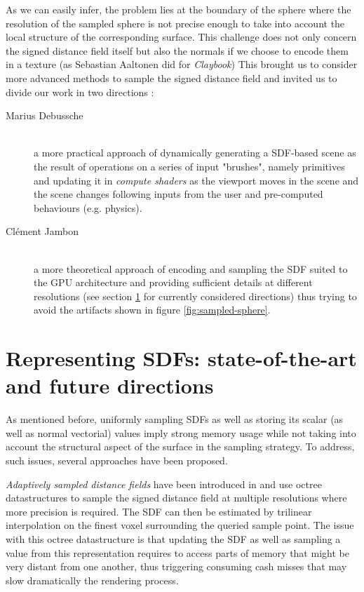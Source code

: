 \documentclass[10pt,a4paper,english, twocolumn]{article}
\begin{document}
As we can easily infer, the problem lies at the boundary of the sphere where the resolution of the sampled sphere is not precise enough to take into account the local structure of the corresponding surface. This challenge does not only concern the signed distance field itself but also the normals if we choose to encode them in a texture (as Sebastian Aaltonen did for \textit{Claybook}) This brought us to consider more advanced methods to sample the signed distance field and invited us to divide our work in two directions :
\begin{description}
    \item[Marius Debussche] $ $ \\
    a more practical approach of dynamically generating a SDF-based scene as the result of operations on a series of input "brushes", namely primitives and updating it in \textit{compute shaders} as the viewport moves in the scene and the scene changes following inputs from the user and pre-computed behaviours (e.g. physics).
    \item[Clément Jambon] $ $ \\
    a more theoretical approach of encoding and sampling the SDF suited to the GPU architecture and providing sufficient details at different resolutions (see section \ref{sec:representing-sdf} for currently considered directions) thus trying to avoid the artifacts shown in figure \ref{fig:sampled-sphere}.
\end{description}

\section{Representing SDFs: state-of-the-art and future directions}
\label{sec:representing-sdf}

As mentioned before, uniformly sampling SDFs as well as storing its scalar (as well as normal vectorial) values imply strong memory usage while not taking into account the structural aspect of the surface in the sampling strategy. To address, such issues, several approaches have been proposed.

\textit{Adaptively sampled distance fields} have been introduced in \cite{10.1145/344779.344899} and use octree datastructures to sample the signed distance field at multiple resolutions where more precision is required. The SDF can then be estimated by trilinear interpolation on the finest voxel surrounding the queried sample point. The issue with this octree datastructure is that updating the SDF as well as sampling a value from this representation requires to access parts of memory that might be very distant from one another, thus triggering consuming cash misses that may slow dramatically the rendering process.
\end{document}
